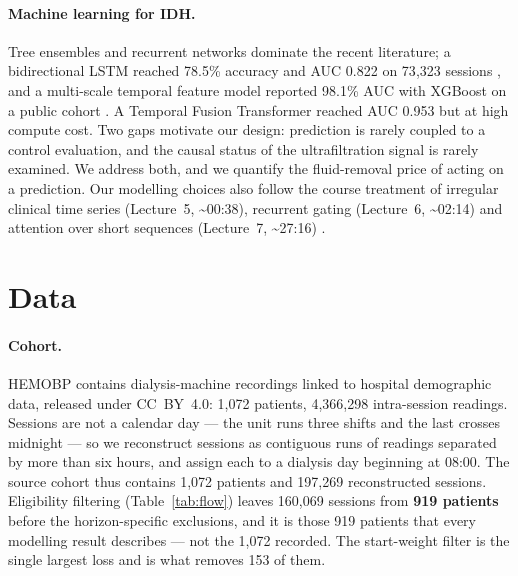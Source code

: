 \documentclass{article}
\begin{document}
\paragraph{Machine learning for IDH.} Tree ensembles and recurrent networks dominate the recent literature; a bidirectional LSTM reached 78.5\% accuracy and AUC 0.822 on 73{,}323 sessions \citep{bi2022lstm}, and a multi-scale temporal feature model reported 98.1\% AUC with XGBoost on a public cohort \citep{idhmstf2025}. A Temporal Fusion Transformer reached AUC 0.953 but at high compute cost. Two gaps motivate our design: prediction is rarely coupled to a control evaluation, and the causal status of the ultrafiltration signal is rarely examined. We address both, and we quantify the fluid-removal price of acting on a prediction. Our modelling choices also follow the course treatment of irregular clinical time series (Lecture~5, \textasciitilde 00:38),
recurrent gating (Lecture~6, \textasciitilde 02:14) and attention over short sequences (Lecture~7, \textasciitilde 27:16)
\citep{md6329lectures}.

\section{Data}

\paragraph{Cohort.} HEMOBP \citep{lin2019hemobp} contains dialysis-machine recordings linked to hospital demographic data, released under CC~BY~4.0: 1{,}072 patients, 4{,}366{,}298 intra-session readings. Sessions are not a calendar day --- the unit runs three shifts and the last crosses midnight --- so we reconstruct sessions as contiguous runs of readings separated by more than six hours, and assign each to a dialysis day beginning at 08:00. The source cohort thus contains 1{,}072 patients and 197{,}269 reconstructed sessions. Eligibility filtering
(Table~\ref{tab:flow}) leaves 160{,}069 sessions from \textbf{919 patients} before the horizon-specific exclusions, and it is
those 919 patients that every modelling result describes --- not the 1{,}072 recorded. The start-weight filter is the single
largest loss and is what removes 153 of them.
\end{document}
